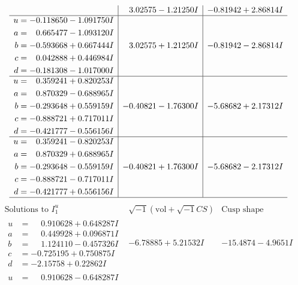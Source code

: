 \documentclass[1p]{elsarticle_modified}
\theoremstyle{definition}
\newcommand{\I}{\sqrt{-1}}
\begin{document}
$$\begin{array}{c|c|c}
 & \phantom{-}3.02575 - 1.21250 I & -0.81942 + 2.86814 I \\ \hline\begin{aligned}
u &= -0.118650 - 1.091750 I \\
a &= \phantom{-}0.665477 - 1.093120 I \\
b &= -0.593668 + 0.667444 I \\
c &= \phantom{-}0.042888 + 0.446984 I \\
d &= -0.181308 - 1.017000 I\end{aligned}
 & \phantom{-}3.02575 + 1.21250 I & -0.81942 - 2.86814 I \\ \hline\begin{aligned}
u &= \phantom{-}0.359241 + 0.820253 I \\
a &= \phantom{-}0.870329 - 0.688965 I \\
b &= -0.293648 + 0.559159 I \\
c &= -0.888721 + 0.717011 I \\
d &= -0.421777 - 0.556156 I\end{aligned}
 & -0.40821 - 1.76300 I & -5.68682 + 2.17312 I \\ \hline\begin{aligned}
u &= \phantom{-}0.359241 - 0.820253 I \\
a &= \phantom{-}0.870329 + 0.688965 I \\
b &= -0.293648 - 0.559159 I \\
c &= -0.888721 - 0.717011 I \\
d &= -0.421777 + 0.556156 I\end{aligned}
 & -0.40821 + 1.76300 I & -5.68682 - 2.17312 I\\
 \hline 
 \end{array}$$\newpage$$\begin{array}{c|c|c}  
\text{Solutions to }I^u_{1}& \I (\text{vol} + \sqrt{-1}CS) & \text{Cusp shape}\\
 \hline 
\begin{aligned}
u &= \phantom{-}0.910628 + 0.648287 I \\
a &= \phantom{-}0.449928 + 0.096871 I \\
b &= \phantom{-}1.124110 - 0.457326 I \\
c &= -0.725195 + 0.750875 I \\
d &= -2.15758 + 0.22862 I\end{aligned}
 & -6.78885 + 5.21532 I & -15.4874 - 4.9651 I \\ \hline\begin{aligned}
u &= \phantom{-}0.910628 - 0.648287 I \\

\end{aligned}
\end{array}$$
\end{document}
